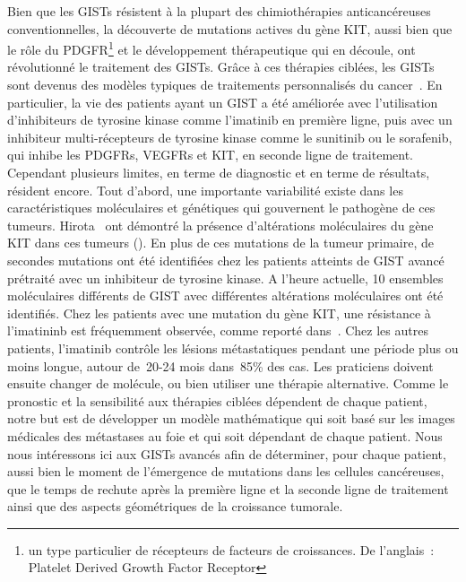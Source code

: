 \documentclass[main.tex]{subfiles}
\begin{document}
Bien que les GISTs résistent à la plupart des chimiothérapies anticancéreuses conventionnelles, 
la découverte de mutations actives du gène KIT, aussi bien que le rôle du PDGFR\footnote{un type particulier de récepteurs de facteurs de croissances. De l'anglais~: Platelet Derived Growth Factor Receptor} et le développement thérapeutique qui en découle, ont révolutionné le traitement des GISTs.
Grâce à ces thérapies ciblées, les GISTs sont devenus des modèles typiques de traitements personnalisés du cancer~\cite{Blay2012}. 
En particulier, la vie des patients ayant un GIST a été améliorée avec l'utilisation d'inhibiteurs de tyrosine kinase comme l'imatinib en première ligne, puis avec un inhibiteur multi-récepteurs de tyrosine kinase comme 
le sunitinib ou le sorafenib,  
qui inhibe les PDGFRs, VEGFRs et KIT, en seconde ligne de traitement. 
Cependant plusieurs limites, en terme de diagnostic et en terme de résultats, résident encore.
Tout d'abord, une importante variabilité existe dans les caractéristiques moléculaires et génétiques qui gouvernent le pathogène de ces tumeurs.
Hirota \etal\ ont démontré la présence d'altérations moléculaires du gène KIT dans ces tumeurs (\cf \cite{Hirota1998}). 
En plus de ces mutations de la tumeur primaire, de secondes mutations ont été identifiées chez les patients atteints de GIST avancé prétraité avec un inhibiteur de tyrosine kinase. A l'heure actuelle, 10 ensembles moléculaires différents de GIST avec différentes altérations moléculaires ont été identifiés. 
Chez les patients avec une mutation du gène KIT, une résistance à l'imatininb est fréquemment observée, comme reporté dans~\cite{Blay2011}. 
Chez les autres patients, l'imatinib contrôle les lésions métastatiques pendant une période plus ou moins longue, autour de~20-24 mois dans~85\% des cas. 
Les praticiens doivent ensuite changer de molécule, ou bien utiliser une thérapie alternative. 
Comme le pronostic et la sensibilité aux thérapies ciblées dépendent de chaque patient, notre but est de développer un modèle mathématique qui soit basé sur les images médicales des métastases au foie et qui soit dépendant de chaque patient. 
Nous nous intéressons ici aux GISTs avancés afin de déterminer, pour chaque patient, aussi bien le moment de l'émergence de mutations dans les cellules cancéreuses, que le temps de rechute après la première ligne et la seconde ligne de traitement ainsi que des aspects géométriques de la croissance tumorale.
\end{document}
